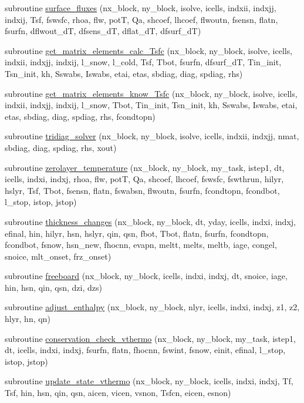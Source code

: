 \begin{DoxyCompactItemize}
\item 
subroutine \hyperlink{namespaceice__therm__vertical_aa2320460f9c52d821db02db2209fa888}{surface\_\-fluxes} (nx\_\-block, ny\_\-block, isolve, icells, indxii, indxjj, indxij, Tsf, fswsfc, rhoa, flw, potT, Qa, shcoef, lhcoef, flwoutn, fsensn, flatn, fsurfn, dflwout\_\-dT, dfsens\_\-dT, dflat\_\-dT, dfsurf\_\-dT)
\item 
subroutine \hyperlink{namespaceice__therm__vertical_a40c9d90a69710b5b555fd78ff83c3009}{get\_\-matrix\_\-elements\_\-calc\_\-Tsfc} (nx\_\-block, ny\_\-block, isolve, icells, indxii, indxjj, indxij, l\_\-snow, l\_\-cold, Tsf, Tbot, fsurfn, dfsurf\_\-dT, Tin\_\-init, Tsn\_\-init, kh, Sswabs, Iswabs, etai, etas, sbdiag, diag, spdiag, rhs)
\item 
subroutine \hyperlink{namespaceice__therm__vertical_ad636d3bbc26f9737173a670b7c43bfec}{get\_\-matrix\_\-elements\_\-know\_\-Tsfc} (nx\_\-block, ny\_\-block, isolve, icells, indxii, indxjj, indxij, l\_\-snow, Tbot, Tin\_\-init, Tsn\_\-init, kh, Sswabs, Iswabs, etai, etas, sbdiag, diag, spdiag, rhs, fcondtopn)
\item 
subroutine \hyperlink{namespaceice__therm__vertical_aa5780ef62e3f9b27790b7ba6c47116a0}{tridiag\_\-solver} (nx\_\-block, ny\_\-block, isolve, icells, indxii, indxjj, nmat, sbdiag, diag, spdiag, rhs, xout)
\item 
subroutine \hyperlink{namespaceice__therm__vertical_a862eb3ec0eaa2a5ae48961730e1ba7ce}{zerolayer\_\-temperature} (nx\_\-block, ny\_\-block, my\_\-task, istep1, dt, icells, indxi, indxj, rhoa, flw, potT, Qa, shcoef, lhcoef, fswsfc, fswthrun, hilyr, hslyr, Tsf, Tbot, fsensn, flatn, fswabsn, flwoutn, fsurfn, fcondtopn, fcondbot, l\_\-stop, istop, jstop)
\item 
subroutine \hyperlink{namespaceice__therm__vertical_ad24b5fda2cb4af3cda6722209668aa77}{thickness\_\-changes} (nx\_\-block, ny\_\-block, dt, yday, icells, indxi, indxj, efinal, hin, hilyr, hsn, hslyr, qin, qsn, fbot, Tbot, flatn, fsurfn, fcondtopn, fcondbot, fsnow, hsn\_\-new, fhocnn, evapn, meltt, melts, meltb, iage, congel, snoice, mlt\_\-onset, frz\_\-onset)
\item 
subroutine \hyperlink{namespaceice__therm__vertical_af560526921bc546f96377e533243089f}{freeboard} (nx\_\-block, ny\_\-block, icells, indxi, indxj, dt, snoice, iage, hin, hsn, qin, qsn, dzi, dzs)
\item 
subroutine \hyperlink{namespaceice__therm__vertical_a6845923f0ff5d01b9c66f9a41d0eb24d}{adjust\_\-enthalpy} (nx\_\-block, ny\_\-block, nlyr, icells, indxi, indxj, z1, z2, hlyr, hn, qn)
\item 
subroutine \hyperlink{namespaceice__therm__vertical_a4f2f790706910417fe9bbaaa1ad6efa3}{conservation\_\-check\_\-vthermo} (nx\_\-block, ny\_\-block, my\_\-task, istep1, dt, icells, indxi, indxj, fsurfn, flatn, fhocnn, fswint, fsnow, einit, efinal, l\_\-stop, istop, jstop)
\item 
subroutine \hyperlink{namespaceice__therm__vertical_a64f63f03c5a0e61472486ace19c6b9d5}{update\_\-state\_\-vthermo} (nx\_\-block, ny\_\-block, icells, indxi, indxj, Tf, Tsf, hin, hsn, qin, qsn, aicen, vicen, vsnon, Tsfcn, eicen, esnon)
\end{DoxyCompactItemize}
